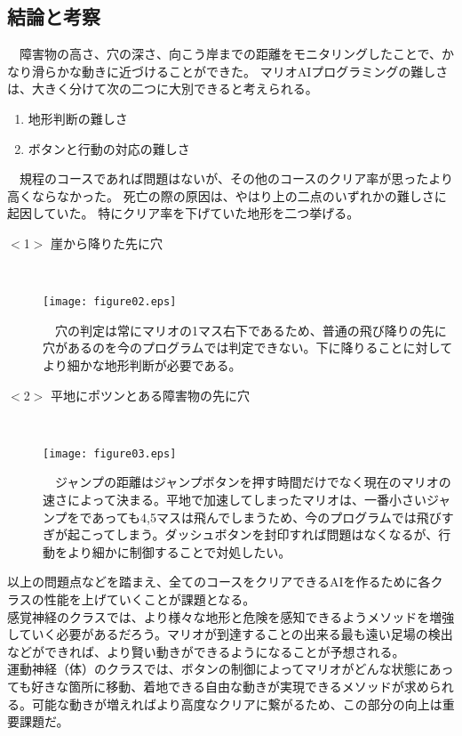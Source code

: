 \documentclass[a4j]{jarticle}
\begin{document}
\subsection{結論と考察}
　障害物の高さ、穴の深さ、向こう岸までの距離をモニタリングしたことで、かなり滑らかな動きに近づけることができた。
マリオAIプログラミングの難しさは、大きく分けて次の二つに大別できると考えられる。
\begin{enumerate}
\item 地形判断の難しさ
\item ボタンと行動の対応の難しさ
\end{enumerate}
　規程のコースであれば問題はないが、その他のコースのクリア率が思ったより高くならなかった。
死亡の際の原因は、やはり上の二点のいずれかの難しさに起因していた。
特にクリア率を下げていた地形を二つ挙げる。
\begin{description}
  \item [$<$1$>$ 崖から降りた先に穴] ~\\
\begin{center}
\texttt{[image: figure02.eps]}
\end{center}
　穴の判定は常にマリオの1マス右下であるため、普通の飛び降りの先に穴があるのを今のプログラムでは判定できない。下に降りることに対してより細かな地形判断が必要である。
　\item[$<$2$>$ 平地にポツンとある障害物の先に穴]~\\
\begin{center}
\texttt{[image: figure03.eps]}
\end{center}
　ジャンプの距離はジャンプボタンを押す時間だけでなく現在のマリオの速さによって決まる。平地で加速してしまったマリオは、一番小さいジャンプをであっても4,5マスは飛んでしまうため、今のプログラムでは飛びすぎが起こってしまう。ダッシュボタンを封印すれば問題はなくなるが、行動をより細かに制御することで対処したい。
\end{description}

以上の問題点などを踏まえ、全てのコースをクリアできるAIを作るために各クラスの性能を上げていくことが課題となる。
\\

感覚神経のクラスでは、より様々な地形と危険を感知できるようメソッドを増強していく必要があるだろう。マリオが到達することの出来る最も遠い足場の検出などができれば、より賢い動きができるようになることが予想される。
\\

運動神経（体）のクラスでは、ボタンの制御によってマリオがどんな状態にあっても好きな箇所に移動、着地できる自由な動きが実現できるメソッドが求められる。可能な動きが増えればより高度なクリアに繋がるため、この部分の向上は重要課題だ。
\\
\end{document}
